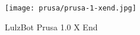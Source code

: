 
\begin{figure}[h!]
\texttt{[image: prusa/prusa-1-xend.jpg]}
 \caption{LulzBot Prusa 1.0 X End}
 \label{fig:prusa-1-xend}
\end{figure}

